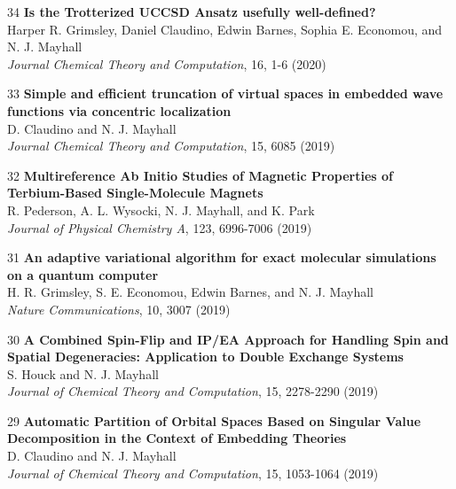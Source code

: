 \documentclass[10pt]{article}
\newenvironment{lonelist}[1][\enskip\textbullet]%
        {\vspace{-\baselineskip}\begin{list}{#1}{%
        \setlength{\partopsep}{0pt}%
        \setlength{\topsep}{0pt}}}
        {\end{list}\vspace{-.6\baselineskip}}
\begin{document}
\begin{lonelist}
\item[34\hspace{4pt}] \textbf{Is the Trotterized UCCSD Ansatz usefully well-defined?} \\
Harper R. Grimsley, Daniel Claudino, Edwin Barnes, Sophia E. Economou, and N. J. Mayhall \\
	\textsl{Journal Chemical Theory and Computation}, 16,  1-6 (2020)

\item[33\hspace{4pt}] \textbf{Simple and efficient truncation of virtual spaces in embedded wave functions via concentric localization} \\
D. Claudino and N. J. Mayhall \\
	\textsl{Journal Chemical Theory and Computation}, 15, 6085 (2019)

\item[32\hspace{4pt}] \textbf{Multireference Ab Initio Studies of Magnetic Properties of Terbium-Based Single-Molecule Magnets} \\
	R. Pederson, A. L. Wysocki, N. J. Mayhall, and K. Park\\
\textsl{Journal of Physical Chemistry A},  123, 6996-7006 (2019)

\item[31\hspace{4pt}] \textbf{An adaptive variational algorithm for exact molecular simulations on a quantum computer} \\
	H. R. Grimsley, S. E. Economou, Edwin Barnes,  and N. J. Mayhall\\
\textsl{Nature Communications},  10, 3007 (2019)

\item[30\hspace{4pt}] \textbf{A Combined Spin-Flip and IP/EA Approach for Handling Spin and Spatial Degeneracies: Application to Double Exchange Systems} \\
	S. Houck and N. J. Mayhall\\
\textsl{Journal of Chemical Theory and Computation}, 15, 2278-2290 (2019)

\item[29\hspace{4pt}] \textbf{Automatic Partition of Orbital Spaces Based on Singular Value Decomposition in the Context of Embedding Theories} \\
	D. Claudino and N. J. Mayhall\\
\textsl{Journal of Chemical Theory and Computation}, 15, 1053-1064 (2019)


\end{lonelist}
\end{document}
